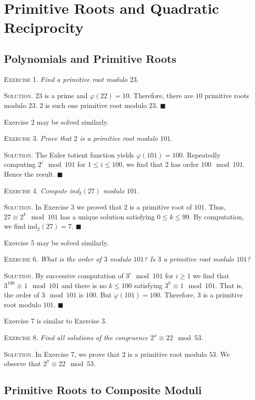 \documentclass[11pt, leqno]{article}
\newcommand{\done}{\ensuremath{\blacksquare}}
\begin{document}
\section{Primitive Roots and Quadratic Reciprocity}

\subsection{Polynomials and Primitive Roots}

\textsc{Exercise 1}. \emph{Find a primitive root modulo $23$.}

\textsc{Solution}. 23 is a prime and $\varphi(22) = 10$. Therefore, there are $10$ primitive roots modulo $23$. $2$ is such one primitive root modulo $23$. \done

Exercise 2 may be solved similarly.

\textsc{Exercise 3}. \emph{Prove that $2$ is a primitive root modulo $101$.}

\textsc{Solution}. The Euler totient function yields $\varphi(101) = 100$. Repeatedly computing $2^i \mod 101$ for $1\leq i \leq 100$, we find that $2$ has order $100 \mod 101$. Hence the result. \done

\textsc{Exercise 4}. \emph{Compute \emph{ind}$_2(27)$ modulo $101$.}

\textsc{Solution}. In Exercise 3 we proved that $2$ is a primitive root of $101$. Thus, $27 \equiv 2^k \mod 101$ has a unique solution satisfying $0\leq k \leq 99$. By computation, we find ind$_2(27) = 7$. \done

Exercise 5 may be solved similarly.

\textsc{Exercise 6}. \emph{What is the order of $3$ modulo $101$? Is $3$ a primitive root modulo $101$?}

\textsc{Solution}. By successive computation of $3^i \mod 101$ for $i\geq 1$ we find that $3^{100}\equiv 1 \mod 101$ and there is no $k\leq 100$ satisfying $3^k \equiv 1 \mod 101$. That is, the order of $3 \mod 101$ is $100$. But $\varphi(101) = 100$. Therefore, $3$ is a primitive root modulo $101$. \done

Exercise 7 is similar to Exercise 3.

\textsc{Exercise 8}. \emph{Find all solutions of the congruence $2^x \equiv 22 \mod 53$}.

\textsc{Solution}. In Exercise 7, we prove that $2$ is a primitive root modulo $53$. We observe that $2^7 \equiv 22 \mod 53$. 

\subsection{Primitive Roots to Composite Moduli}
\end{document}

